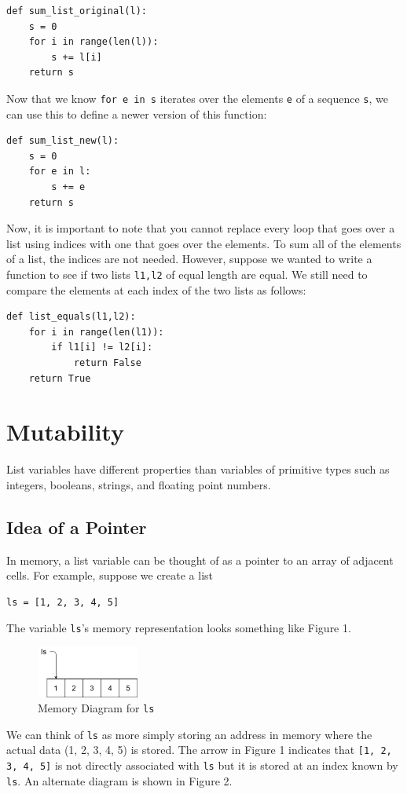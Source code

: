 \documentclass{article}
\begin{document}
\begin{verbatim}
def sum_list_original(l):
    s = 0
    for i in range(len(l)):
        s += l[i]
    return s
\end{verbatim}
Now that we know \texttt{for e in s} iterates over the elements \texttt{e} of a sequence \texttt{s}, we can use this to define a newer version of this function:
\begin{verbatim}
def sum_list_new(l):
    s = 0
    for e in l:
        s += e
    return s
\end{verbatim}
Now, it is important to note that you cannot replace every loop that goes over a list using indices with one that goes over the elements. To sum all of the elements of a list, the indices are not needed. However, suppose we wanted to write a function to see if two lists \texttt{l1,l2} of equal length are equal. We still need to compare the elements at each index of the two lists as follows:
\begin{verbatim}
def list_equals(l1,l2):
    for i in range(len(l1)):
        if l1[i] != l2[i]:
            return False
    return True
\end{verbatim}


\section{Mutability}
List variables have different properties than variables of primitive types such as integers, booleans, strings, and floating point numbers. 

\subsection{Idea of a Pointer}
In memory, a list variable can be thought of as a pointer to an array of adjacent cells. For example, suppose we create a list
\begin{verbatim}
ls = [1, 2, 3, 4, 5]
\end{verbatim}
The variable \texttt{ls}'s memory representation looks something like Figure 1.

\newpage

\begin{figure}[hbt]
    \centering
    \includegraphics[width=0.3\textwidth]{pointer_diagram_1.png}
    \caption{Memory Diagram for \texttt{ls}}
    \label{fig:my_label}
\end{figure}
\noindent We can think of \texttt{ls} as more simply storing an address in memory where the actual data (1, 2, 3, 4, 5) is stored. The arrow in Figure 1 indicates that \texttt{[1, 2, 3, 4, 5]} is not directly associated with \texttt{ls} but it is stored at an index known by \texttt{ls}. An alternate diagram is shown in Figure 2.
\end{document}
